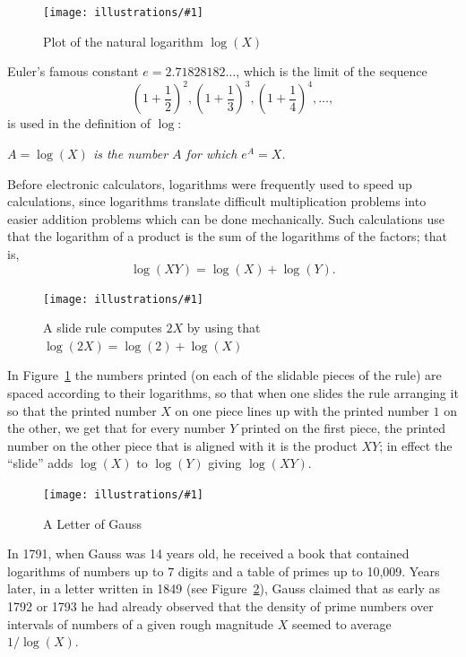 \documentclass[openany]{book}
\newcommand{\ill}[3]{%
   \begin{figure}[H]%
   \vspace{-2ex}
   \centering%
   \texttt{[image: illustrations/\#1]}%
   \caption{#3}%
   \vspace{-2ex}
    \end{figure}}
\theoremstyle{plain}
\theoremstyle{definition}
\begin{document}
\ill{log}{.8}{Plot of the natural logarithm $\log(X)$}

 Euler's famous constant $e=2.71828182\ldots$, which is the limit
 of the sequence
 $$\left(1+{\frac{1}{2}}\right)^2,
       \left(1+{\frac{1}{3}}\right)^3,
       \left(1+{\frac{1}{4}}\right)^4, \dots,$$
is used in the definition of $\log$:
\begin{center}
{\em $A = \log(X)$ is the number $A$ for which $e^A = X$.}
\end{center}
Before electronic calculators, logarithms were frequently used to
speed up calculations, since logarithms translate difficult multiplication
problems into easier addition problems which can be done mechanically.
Such calculations use that the logarithm of a product is the sum of the logarithms
of the factors; that is, $$\log(X Y) = \log(X) + \log(Y).$$

\ill{slide_rule}{.8}{A slide rule  computes $2X$ by using that $\log(2X)=\log(2)+\log(X)$\label{fig:slide_rule}}

In Figure~\ref{fig:slide_rule} the numbers printed (on each of the slidable pieces of the rule)
are spaced according to their logarithms, so that when one slides the
rule arranging it so that the printed  number $X$ on one piece lines up
with the printed number $1$ on the other, we get that for every number $Y$
printed on the first piece, the printed number on the other piece that
is  aligned with it is the product $XY$; in effect the ``slide'' adds
$\log(X)$ to $\log(Y)$ giving $\log(XY)$.

\ill{gauss_tables_half}{.9}{A Letter of Gauss\label{fig:gauss_letter}}

In 1791, when Gauss was 14 years old, he received a book that contained
logarithms of numbers up to $7$ digits and a table of primes up to 10{,}009.
Years later, in a letter
written in 1849 (see Figure~\ref{fig:gauss_letter}), Gauss
claimed that as early as 1792 or 1793 he had already observed that the
density of prime numbers over intervals of numbers of a given rough
magnitude $X$ seemed to average $1/\log(X)$.
\end{document}
